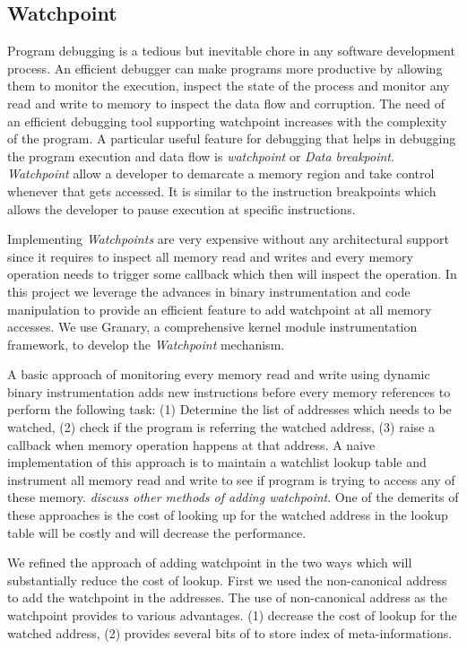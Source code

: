 \subsection{Watchpoint}
Program debugging is a tedious but inevitable chore in any software development process. An efficient debugger can make programs more productive by allowing them to monitor the execution, inspect the state of the process and monitor any read and write to memory to inspect the data flow and corruption. The need of an efficient debugging tool supporting watchpoint increases with the complexity of the program. A particular useful feature for debugging that helps in debugging the program execution and data flow is \emph{watchpoint} or \emph{Data breakpoint}. \emph{Watchpoint} allow a developer to demarcate a memory region and take control whenever that gets accessed. It is similar to the instruction breakpoints which allows the developer to pause execution at specific instructions.

Implementing  \emph{Watchpoints} are very expensive without any architectural support since it requires to inspect all memory read and writes and every memory operation needs to trigger some callback which then will inspect the operation.  In this project we leverage the advances in binary instrumentation and code manipulation to provide an efficient feature to add watchpoint at all memory accesses. We use Granary, a comprehensive kernel module instrumentation framework, to develop the \emph{Watchpoint} mechanism.

A basic approach of monitoring every memory read and write using dynamic binary instrumentation adds new instructions before every memory references to perform the following task: (1) Determine the list of addresses which needs to be watched, (2) check if the program is referring the watched address, (3) raise a callback when memory operation happens at that address. A naive implementation of this approach is to maintain a watchlist lookup table and instrument all memory read and write to see if program is trying to access any of these memory. \emph{discuss other methods of adding watchpoint}. One of the demerits of these approaches is the cost of looking up for the watched address in the lookup table will be costly and will decrease the performance.

We refined the approach of adding watchpoint in the two ways which will substantially reduce the cost of lookup.  First we used the non-canonical address to add the watchpoint in the addresses. The use of  non-canonical address as the watchpoint provides to various advantages. (1) decrease the cost of lookup for the watched address, (2) provides several bits of to store index of meta-informations.

